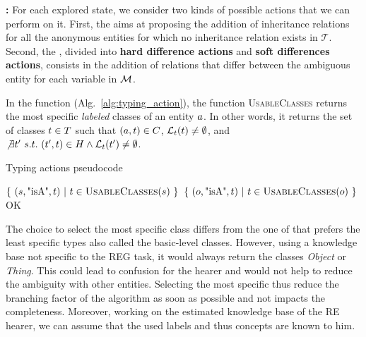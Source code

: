 \textbf{\actions: }
For each explored state, we consider two kinds of possible actions that we can perform on it. First, the \typingactions{} aims at proposing the addition of inheritance relations for all the anonymous entities for which no inheritance relation exists in $\mathcal{T}$. Second, the \differenceactions{}, divided into \textbf{hard difference actions} and \textbf{soft differences actions}, consists in the addition of relations that differ between the ambiguous entity for each variable in $\mathcal{M}$.

In the \typingactions{} function (Alg.~\ref{alg:typing_action}), the function \textsc{UsableClasses} returns the most specific \textit{labeled} classes of an entity $a$. In other words, it returns the set of classes $t \in T$ such that $(a,t) \in C$, $\mathcal{L}_t(t) \neq \emptyset$, and
$\not\exists t'\ s.t.\ (t', t) \in H \wedge \mathcal{L}_t(t') \neq \emptyset$.

\begin{algorithm}[htb!]
\caption{\label{alg:typing_action} Typing actions pseudocode}
\begin{algorithmic}

        
                \State \Return $\{\ (s,\text{"isA"},t)\ |\ t \in \textsc{UsableClasses}(s)\  \}$
                \State \Return $\{\ (o,\text{"isA"},t)\ |\ t \in \textsc{UsableClasses}(o)\  \}$
            \EndIf
        \EndFor
        \Return OK 
    \EndFunction
\end{algorithmic}
\end{algorithm}

The choice to select the most specific class differs from the one of \cite{dale_1995_computational} that prefers the least specific types also called the basic-level classes. However, using a knowledge base not specific to the REG task, it would always return the classes \textit{Object} or \textit{Thing}. This could lead to confusion for the hearer and would not help to reduce the ambiguity with other entities. Selecting the most specific thus reduce the branching factor of the algorithm as soon as possible and not impacts the completeness. Moreover, working on the estimated knowledge base of the RE hearer, we can assume that the used labels and thus concepts are known to him.

